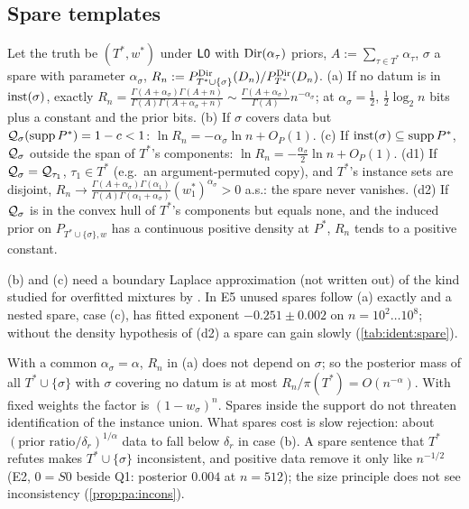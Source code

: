 \subsection{Spare templates}\label{sec:ident:spare}

\begin{proposition}\identbrk{}\label{prop:ident:spare}
Let the truth be $(T^*,w^*)$ under $\mathord{\mathsf{L0}}$ with $\mathrm{Dir}(\alpha_\tau)$ priors, $A:=\sum_{\tau\in T^*}\alpha_\tau$, $\sigma$ a spare with parameter $\alpha_\sigma$, $R_n:=P^{\mathrm{Dir}}_{T^*\cup\{\sigma\}}(D_n)/P^{\mathrm{Dir}}_{T^*}(D_n)$.
(a) If no datum is in $\mathrm{inst}(\sigma)$, exactly $R_n=\frac{\Gamma(A+\alpha_\sigma)\Gamma(A+n)}{\Gamma(A)\Gamma(A+\alpha_\sigma+n)}\sim\frac{\Gamma(A+\alpha_\sigma)}{\Gamma(A)}n^{-\alpha_\sigma}$; at $\alpha_\sigma=\frac12$, $\frac12\log_2n$ bits plus a constant and the prior bits.
(b) If $\sigma$ covers data but $\mathcal{Q}_\sigma(\operatorname{supp}P^*)=1-c<1$: $\ln R_n=-\alpha_\sigma\ln n+O_P(1)$.
(c) If $\mathrm{inst}(\sigma)\subseteq\operatorname{supp}P^*$, $\mathcal{Q}_\sigma$ outside the span of $T^*$'s components: $\ln R_n=-\frac{\alpha_\sigma}2\ln n+O_P(1)$.
(d1) If $\mathcal{Q}_\sigma=\mathcal{Q}_{\tau_1}$, $\tau_1\in T^*$ (e.g.\ an argument-permuted copy), and $T^*$'s instance sets are disjoint, $R_n\to\frac{\Gamma(A+\alpha_\sigma)\Gamma(\alpha_1)}{\Gamma(A)\Gamma(\alpha_1+\alpha_\sigma)}(w^*_1)^{\alpha_\sigma}>0$ a.s.: the spare never vanishes.
(d2) If $\mathcal{Q}_\sigma$ is in the convex hull of $T^*$'s components but equals none, and the induced prior on $P_{T^*\cup\{\sigma\},w}$ has a continuous positive density at $P^*$, $R_n$ tends to a positive constant.
\end{proposition}

\noindent (b) and (c) need a boundary Laplace approximation (not written out) of the kind studied for overfitted mixtures by \citet{rousseau2011asymptotic}. In E5 unused spares follow (a) exactly and a nested spare, case (c), has fitted exponent $-0.251\pm0.002$ on $n=10^2\ldots10^8$; without the density hypothesis of (d2) a spare can gain slowly (\cref{tab:ident:spare}).

\begin{remark}\identbrk{}\label{rem:ident:sparetotal}
With a common $\alpha_\sigma=\alpha$, $R_n$ in (a) does not depend on $\sigma$; so the posterior mass of all $T^*\cup\{\sigma\}$ with $\sigma$ covering no datum is at most $R_n/\pi(T^*)=O(n^{-\alpha})$. With fixed weights the factor is $(1-w_\sigma)^n$. Spares inside the support do not threaten identification of the instance union. What spares cost is slow rejection: about $(\text{prior ratio}/\delta_r)^{1/\alpha}$ data to fall below $\delta_r$ in case (b). A spare sentence that $T^*$ refutes makes $T^*\cup\{\sigma\}$ inconsistent, and positive data remove it only like $n^{-1/2}$ (E2, $0=S0$ beside Q1: posterior $0.004$ at $n=512$); the size principle does not see inconsistency (\cref{prop:pa:incons}).
\end{remark}

